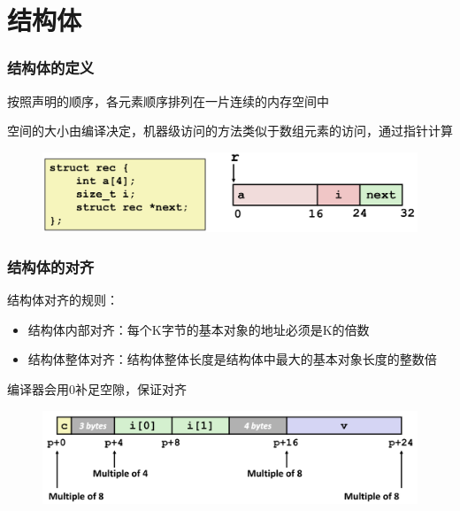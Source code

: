 \documentclass[12pt,AutoFakeBold,aspectratio=169,mathserif]{beamer}
\begin{document}
    \section{结构体}

    \begin{frame}
        \frametitle{结构体的定义}
    
        按照声明的顺序，各元素顺序排列在一片连续的内存空间中

        空间的大小由编译决定，机器级访问的方法类似于数组元素的访问，通过指针计算

        \begin{figure}
            \includegraphics[width=.8\textwidth]{figures/strcut.png}
        \end{figure}
    
    \end{frame}

    \begin{frame}
        \frametitle{结构体的对齐}
    
        结构体对齐的规则：
        \begin{itemize}
            \item 结构体内部对齐：每个K字节的基本对象的地址必须是K的倍数
            \item 结构体整体对齐：结构体整体长度是结构体中最大的基本对象长度的整数倍
        \end{itemize}

        编译器会用0补足空隙，保证对齐

        \begin{figure}
            \includegraphics[width=.8\textwidth]{figures/align.png}
        \end{figure}
    
    \end{frame}
\end{document}
